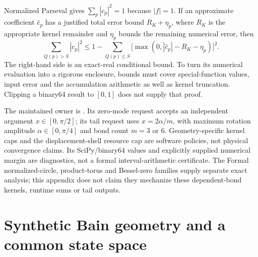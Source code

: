 Normalized Parseval gives $\sum_p|c_p|^2=1$ because $|f|=1$.
If an approximate coefficient $\widehat c_p$ has a justified total error
bound $R_K+\eta_p$, where $R_K$ is the appropriate kernel remainder and
$\eta_p$ bounds the remaining numerical error, then
\begin{equation}
 \sum_{Q(p)>S}|c_p|^2
 \leq1-\sum_{Q(p)\leq S}
       \bigl[\max(0,|\widehat c_p|-R_K-\eta_p)\bigr]^2.
 \label{eq:auxiliary-bessel-shell-tail}
\end{equation}
The right-hand side is an exact-real conditional bound. To turn its numerical
evaluation into a rigorous enclosure, bounds must cover special-function
values, input error and the accumulation arithmetic as well as kernel
truncation. Clipping a binary64 result to $[0,1]$ does not supply that proof.

The maintained owner is
.
Its zero-mode request accepts an independent argument $x\in[0,\pi/2]$;
its tail request uses $x=2\alpha/m$, with maximum rotation amplitude
$\alpha\in[0,\pi/4]$ and bond count $m=3$ or $6$.
Geometry-specific kernel caps and the displacement-shell resource cap are
software policies, not physical convergence claims. Its SciPy/binary64 values
and explicitly supplied numerical margin are diagnostics, not a formal
interval-arithmetic certificate. The Formal normalized-circle, product-torus
and Bessel-zero families supply separate exact analysis; this appendix does
not claim they mechanize these dependent-bond kernels, runtime sums or tail
outputs.

\section{Synthetic Bain geometry and a common state space}

